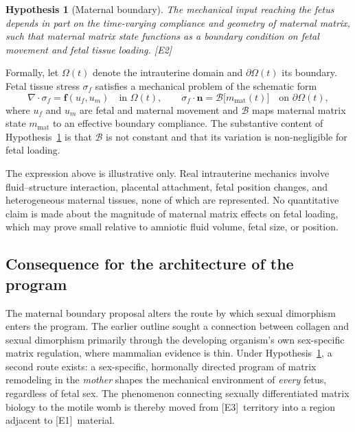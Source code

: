 \documentclass[11pt,a4paper]{article}
\theoremstyle{plain}
\newtheorem{hypothesis}{Hypothesis}[section]
\theoremstyle{definition}
\theoremstyle{remark}
\newcommand{\tier}[1]{\textup{\textsc{[#1]}}}
\newcommand{\Eone}{\tier{E1}}
\newcommand{\Etwo}{\tier{E2}}
\newcommand{\Ethree}{\tier{E3}}
\begin{document}
\begin{hypothesis}[Maternal boundary]\label{hyp:maternalboundary}
The mechanical input reaching the fetus depends in part on the time-varying compliance and geometry of maternal matrix, such that maternal matrix state functions as a boundary condition on fetal movement and fetal tissue loading. \Etwo
\end{hypothesis}

Formally, let $\Omega(t)$ denote the intrauterine domain and $\partial\Omega(t)$ its boundary. Fetal tissue stress $\sigma_f$ satisfies a mechanical problem of the schematic form
\[
\nabla\!\cdot\sigma_f = \mathbf{f}(u_f, u_m) \quad\text{in } \Omega(t), \qquad
\sigma_f\cdot\mathbf{n} = \mathcal{B}\big[m_{\mathrm{mat}}(t)\big]\quad\text{on }\partial\Omega(t),
\]
where $u_f$ and $u_m$ are fetal and maternal movement and $\mathcal{B}$ maps maternal matrix state $m_{\mathrm{mat}}$ to an effective boundary compliance. The substantive content of Hypothesis~\ref{hyp:maternalboundary} is that $\mathcal{B}$ is not constant and that its variation is non-negligible for fetal loading.

\begin{caution}
The expression above is illustrative only. Real intrauterine mechanics involve fluid--structure interaction, placental attachment, fetal position changes, and heterogeneous maternal tissues, none of which are represented. No quantitative claim is made about the magnitude of maternal matrix effects on fetal loading, which may prove small relative to amniotic fluid volume, fetal size, or position.
\end{caution}

\subsection{Consequence for the architecture of the program}

The maternal boundary proposal alters the route by which sexual dimorphism enters the program. The earlier outline sought a connection between collagen and sexual dimorphism primarily through the developing organism's own sex-specific matrix regulation, where mammalian evidence is thin. Under Hypothesis~\ref{hyp:maternalboundary}, a second route exists: a sex-specific, hormonally directed program of matrix remodeling in the \emph{mother} shapes the mechanical environment of \emph{every} fetus, regardless of fetal sex. The phenomenon connecting sexually differentiated matrix biology to the motile womb is thereby moved from \Ethree\ territory into a region adjacent to \Eone\ material.
\end{document}
